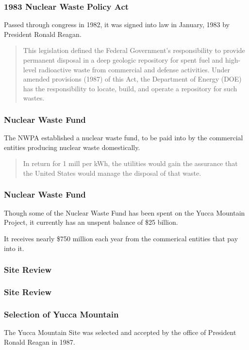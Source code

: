 
\begin{frame}[ctb!]
  \frametitle{1983 Nuclear Waste Policy Act}
  Passed through congress in 1982, it was signed into law in January, 1983 by 
  President Ronald Reagan.


  \begin{quotation}
    This legislation defined the Federal Government’s responsibility to provide 
    permanent disposal in a deep geologic repository for spent fuel and high-level 
    radioactive waste from commercial and defense activities. Under amended 
    provisions (1987)  of this Act, the Department of Energy (DOE) has the 
    responsibility to locate, build, and operate a repository for such wastes. 
    \cite{nrc_backgrounder_2011}
  \end{quotation}

\end{frame}

\begin{frame}[ctb!]
  \frametitle{Nuclear Waste Fund}
  The NWPA established a nuclear waste fund, to be paid into by the commercial 
  entities producing nuclear waste domestically.


  \begin{quotation}
    In return for 1 mill per kWh, the utilities would gain the assurance that 
    the United States would manage the disposal of that waste.
  \end{quotation}

\end{frame}

\begin{frame}[ctb!]
  \frametitle{Nuclear Waste Fund}
  Though some of the Nuclear Waste Fund has been spent on the Yucca Mountain 
  Project, it currently has an unspent balance of \$25 billion. 
  \vspace{1cm}

  It receives nearly \$750 million each year from the commerical entities that 
  pay into it.
\end{frame}


\begin{frame}[ctb!]
  \frametitle{Site Review}
  
\end{frame}

\begin{frame}[ctb!]
  \frametitle{Site Review}
  
\end{frame}

\begin{frame}[ctb!]
  \frametitle{Selection of Yucca Mountain}

  The Yucca Mountain Site was selected and accepted by the office of President 
  Ronald Reagan in 1987. 
  
\end{frame}
